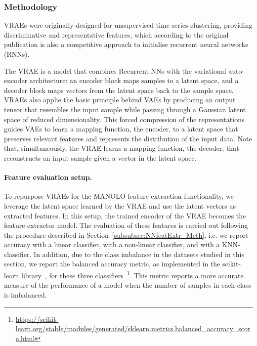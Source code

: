 \subsubsection{Methodology}\label{subsubsec:VRAE_Meth}
VRAEs were originally designed for unsupervised time series clustering, providing discriminative and representative features, which according to the original publication is also a competitive approach to initialise recurrent neural networks (RNNs).
        
The VRAE is a model that combines Recurrent NNs with the variational auto-encoder architecture: an encoder block maps samples to a latent space, and a decoder block maps vectors from the latent space back to the sample space. VRAEs also applie the basic principle behind VAEs by producing an output tensor that resembles the input sample while passing through a Gaussian latent space of reduced dimensionality. This forced compression of the representations guides VAEs to learn a mapping function, the encoder, to a latent space that preserves relevant features and represents the distribution of the input data. Note that, simultaneously, the VRAE learns a mapping function, the decoder, that reconstructs an input sample given a vector in the latent space.

\paragraph{Feature evaluation setup.}  
To repurpose VRAEs for the MANOLO feature extraction functionality, we leverage the latent space learned by the VRAE and use the latent vectors as extracted features. In this setup, the trained encoder of the VRAE becomes the feature extractor model. The evaluation of these features is carried out following the procedure described in Section~\ref{subsubsec:NNfeatExtr_Meth}, i.e. we report accuracy with a linear classifier, with a non-linear classifier, and with a KNN-classifier. In addition, due to the class imbalance in the datasets studied in this section, we report the balanced accuracy metric, as implemented in the scikit-learn library~\cite{scikit-learn}, for these three classifiers~\footnote{\url{https://scikit-learn.org/stable/modules/generated/sklearn.metrics.balanced_accuracy_score.html}}. This metric reports a more accurate measure of the performance of a model when the number of samples in each class is imbalanced.  
    
